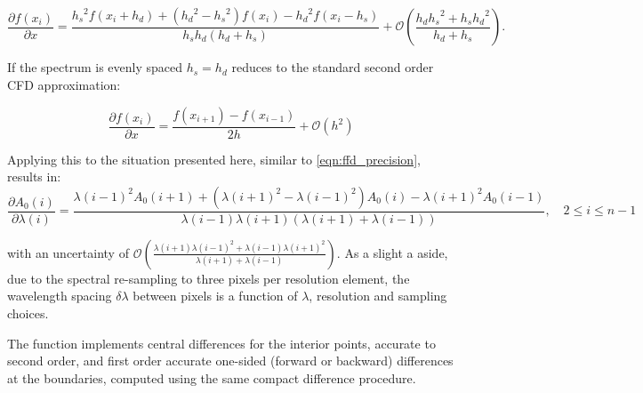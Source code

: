 \[\frac{\partial{f(x_i)}}{\partial{x}} = \frac{{h_{s}}^{2}f\left(x_{i} + {h_{d}}\right) + \left({h_{d}}^{2} - {h_{s}}^{2}\right)f\left(x_{i}\right) - {h_{d}}^{2}f\left(x_{i}-{h_{s}}\right)} {{h_{s}}{h_{d}}\left({h_{d}} + {h_{s}}\right)} + \mathcal{O}\left(\frac{h_{d}{h_{s}}^{2} + {h_{s}}{h_{d}}^{2}}{{h_{d}} + {h_{s}}}\right) \label{full_compact_difference}.\]

If the spectrum is evenly spaced ${h_{s}}={h_{d}}$  reduces to the standard second order {CFD} approximation:

\[\frac{\partial{f(x_i)}}{\partial{x}} = \frac{f\left(x_{i+1}\right) - f\left(x_{i-1}\right)}{2h} + \mathcal{O}\left({h}^{2}\right)\]

Applying this to the situation presented here, similar to \cref{eqn:ffd_precision}, results in:
\[\frac{\partial {A}_{0}(i)}{\partial\lambda(i)} = \frac{{\lambda(i-1)}^{2} {A}_{0}(i+1) + ({\lambda(i+1)}^{2}-{\lambda(i-1)}^{2}) {A}_{0}(i) - {\lambda(i+1)}^{2} {A}_{0}(i-1)} {\lambda(i-1)\lambda(i+1)(\lambda(i+1) + \lambda(i-1))}, \hspace{1em} 2 \leq i \leq n-1\]

with an uncertainty of \(\mathcal{O}\left(\frac{\lambda(i+1){\lambda(i-1)}^{2} + \lambda(i-1){\lambda(i+1)}^{2}}{\lambda(i+1) + \lambda(i-1)}\right)\).
As a slight a aside, due to the spectral re-sampling to three pixels per resolution element, the wavelength spacing \(\delta\lambda\) between pixels is a function of \(\lambda\), resolution and sampling choices.

The \npgradient{} function implements central differences for the interior points, accurate to second order, and first order accurate one-sided (forward or backward) differences at the boundaries, computed using the same compact difference procedure.

